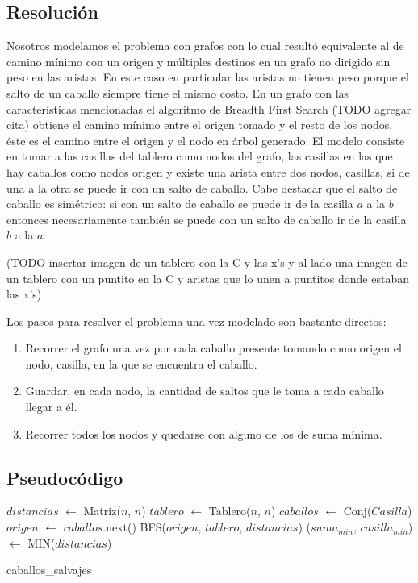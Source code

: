 \subsection{Resolución}
Nosotros modelamos el problema con grafos con lo cual resultó equivalente al de camino mínimo 
con un origen y múltiples destinos en un grafo no dirigido sin peso en las aristas. 
En este caso en particular las aristas no tienen peso porque el salto de un caballo siempre 
tiene el mismo costo. En un grafo con las características mencionadas el algoritmo de 
Breadth First Search (TODO agregar cita) obtiene el camino mínimo entre el origen tomado y el resto de los nodos,
éste es el camino entre el origen y el nodo en árbol generado.
El modelo consiste en tomar a las casillas del tablero como nodos del grafo, las casillas en las que 
hay caballos como nodos origen y existe una arista entre dos nodos, casillas, si de una a la otra se
puede ir con un salto de caballo. Cabe destacar que el salto de caballo es simétrico: si con un salto
de caballo se puede ir de la casilla $a$ a la $b$ entonces necesariamente también se puede con un 
salto de caballo ir de la casilla $b$ a la $a$:\\
\begin{center}
(TODO insertar imagen de un tablero con la C y las x's y al lado una imagen de un tablero con un puntito en
la C y aristas que lo unen a puntitos donde estaban las x's)
\end{center}
Los pasos para resolver el problema una vez modelado son bastante directos:
\begin{enumerate}
  \item Recorrer el grafo una vez por cada caballo presente tomando como origen el nodo, casilla, en la 
    que se encuentra el caballo.
  \item Guardar, en cada nodo, la cantidad de saltos que le toma a cada caballo llegar a él.
  \item Recorrer todos los nodos y quedarse con alguno de los de suma mínima.
\end{enumerate}

\subsection{Pseudocódigo}
\begin{algorithm}[H]
  \begin{algorithmic}
    \STATE $distancias$ $\gets$ Matriz($n$, $n$)
    \STATE $tablero$ $\gets$ Tablero($n$, $n$)
    \STATE $caballos$ $\gets$ Conj($Casilla$)
      \STATE $origen$ $\gets$ $caballos$.next()
      \STATE BFS($origen$, $tablero$, $distancias$)
    \ENDWHILE
    \STATE ($suma_{min}$, $casilla_{min}$) $\gets$ MIN($distancias$)
    \caption{caballos\_salvajes}
  \end{algorithmic}
\end{algorithm}


